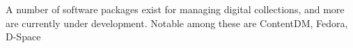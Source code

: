 A number of software packages exist for managing digital collections, and more are currently under development. Notable among these are ContentDM, Fedora, D-Space